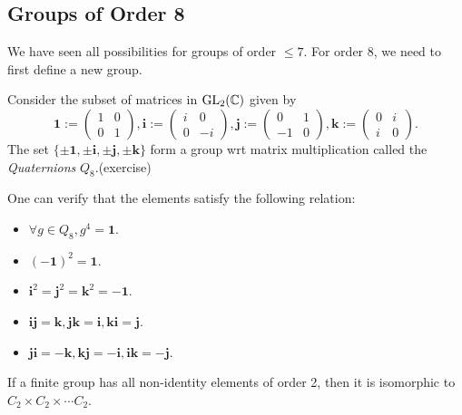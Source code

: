 \documentclass[a4paper]{article}
\begin{document}
    \subsection{Groups of Order 8}
    We have seen all possibilities for groups of order $\le 7$. For order 8, we need to first define a new group.
    \begin{definition}
        Consider the subset of matrices in $ \mathrm{GL}_2(\mathbb{C}) $ given by
        \[
            \mathbf{1}:=\begin{pmatrix}
                1&0\\
                0&1
            \end{pmatrix},
            \mathbf{i}:= \begin{pmatrix}
                i&0\\
                0&-i
            \end{pmatrix},
            \mathbf{j}:=\begin{pmatrix}
                0&1\\
                -1&0
            \end{pmatrix},
            \mathbf{k}:= \begin{pmatrix}
                0&i\\
                i&0
            \end{pmatrix}.
        \]
        The set $ \{\pm \mathbf{1},\pm \mathbf{i},\pm \mathbf{j},\pm \mathbf{k}\} $ form a group wrt matrix multiplication called the \textit{Quaternions} $ Q_8 $.(exercise)
    \end{definition}
    One can verify that the elements satisfy the following relation:
    \begin{itemize}
        \item $ \forall g\in Q_8, g^4=\mathbf{1} $.
        \item $ (-\mathbf{1})^2=\mathbf{1} $.
        \item $ \mathbf{i}^2=\mathbf{j}^2=\mathbf{k}^2=-\mathbf{1} $.
        \item $ \mathbf{i}\mathbf{j}=\mathbf{k},\mathbf{j}\mathbf{k}=\mathbf{i},\mathbf{k}\mathbf{i}=\mathbf{j} $.
        \item $ \mathbf{j}\mathbf{i}=-\mathbf{k}, \mathbf{k}\mathbf{j}=-\mathbf{i}, \mathbf{i}\mathbf{k}=-\mathbf{j}$.
    \end{itemize}
    \begin{lemma}\label{lma:8.2}
        If a finite group has all non-identity elements of order 2, then it is isomorphic to $ C_2 \times C_2 \times \cdots C_2 $.
    \end{lemma}
\end{document}
